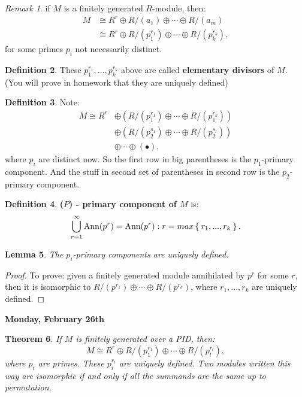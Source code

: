 \documentclass[12pt]{amsbook}
\theoremstyle{plain}
\newtheorem{theorem}{Theorem}[chapter]
\numberwithin{section}{chapter}
\numberwithin{equation}{chapter}
\newtheorem{lem}[theorem]{Lemma}
\theoremstyle{definition}
\newtheorem{Def}[theorem]{Definition}
\theoremstyle{remark}
\newtheorem{rem}[theorem]{Remark}
\newcommand{\bb}{\vspace{3mm}}
\newcommand{\bee}{\begin{equation}\begin{aligned}}
\newcommand{\eee}{\end{aligned}\end{equation}}
\newcommand{\lpar}{\left(}
\newcommand{\rpar}{\right)}
\begin{document}
\begin{rem}
if $M$ is a finitely generated $R$-module, then:
\bee
M &\cong R^r \oplus R/(a_1) \oplus \cdots \oplus R/(a_m)\\
&\cong R^r \oplus  R/(p_1^{r_1}) \oplus \cdots \oplus R/(p_k^{r_k}),
\eee
for some primes $p_i$ not necessarily distinct. 
\end{rem}

\begin{Def}
These $p_1^{r_1},...,p_k^{r_k}$ above are called \textbf{elementary divisors} of $M$. (You will prove in homework that they are uniquely defined)
\end{Def}

\begin{Def}
Note:
\bee
M \cong R^r &\oplus \lpar R/(p_1^{r_1}) \oplus \cdots \oplus R/(p_1^{r_k})\rpar\\
&\oplus \lpar R/(p_2^{s_1}) \oplus \cdots \oplus R/(p_2^{s_l})\rpar\\
&\oplus \cdots \oplus \lpar • \rpar,
\eee
where $p_i$ are distinct now. So the first row in big parentheses is the $p_1$-primary component. And the stuff in second set of parentheses in second row is the $p_2$-primary component. 
\end{Def}

\begin{Def}
\textbf{($P$) - primary component of $M$} is:
$$
\bigcup_{r = 1}^\infty \text{Ann}(p^r) =\text{Ann}(p^r):r = max\Set{r_1,...,r_k}.
$$
\end{Def}

\begin{lem}
The $p_i$-primary components are uniquely defined. 
\end{lem}

\begin{proof}
To prove: given a finitely generated module annihilated by $p^r$ for some $r$, then it is isomorphic to $R/(p^{r_1}) \oplus \cdots \oplus R/(p^{r_k})$, where $r_1,...,r_k$ are uniquely defined. 
\end{proof}

\bb\bb

\textbf{Monday, February 26th}

\begin{theorem}

If $M$ is finitely generated over a PID, then:
$$
M \cong R^r \oplus R/(p_1^{r_1}) \oplus \cdots \oplus R/(p_l^{r_l}),
$$
where $p_i$ are primes. These $p_i^{r_i}$ are uniquely defined. Two modules written this way are isomorphic if and only if all the summands are the same up to permutation. 

\end{theorem}
\end{document}
